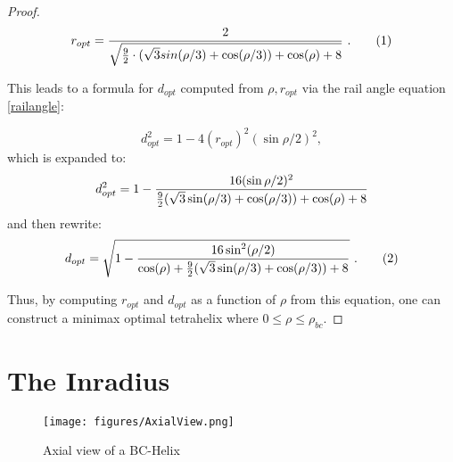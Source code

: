 \documentclass[10pt,final]{journals-1.0/asme2ej}
\newcommand\numberthis{\addtocounter{equation}{1}\tag{\theequation}}
\begin{document}
\begin{proof}
\begin{equation}
  r_{opt} = \frac{2}{\sqrt{\frac{9}{2} \cdot ( \sqrt{3} sin(\rho/3) + \cos(\rho/3)) + \cos(\rho)+ 8 }} \text{ .} \numberthis  \label{eqrhoopt}
\end{equation}


This leads to a formula for $ d_{opt} $ computed from $\rho, r_{opt}$ via the rail angle equation \cref{railangle}:

\begin{equation}
  d_{opt}^2 = 1 - 4 (r_{opt})^2 (\sin{ \rho / 2})^2,
\end{equation}
which is expanded to:
\begin{equation}
  d_{opt}^2 = 1 - \frac{16(\sin{ \rho / 2})^2}{\frac{9}{2} ( \sqrt{3} \sin(\rho/3) + \cos(\rho/3)) + \cos(\rho)+ 8 }    \\
\end{equation}
and then rewrite:
\begin{equation}
    d_{opt} = \sqrt{1 - \frac{16 \sin^2(\rho / 2) }{ \cos(\rho) + \frac{9}{2} ( \sqrt{3} \sin(\rho/3) + \cos(\rho/3)) + 8 }}  \text{ .}  \numberthis  \label{dopt}  \\      
\end{equation}



Thus, by computing $r_{opt}$  and $d_{opt}$ as a function of $\rho$ from this equation, one can
construct a minimax optimal tetrahelix where $0 \leq \rho \leq \rho_{bc}$.
\end{proof}

\section{The Inradius}

\begin{figure}
     \centering
     \texttt{[image: figures/AxialView.png]}
     \caption{Axial view of a BC-Helix}
  \label{axialview}     
\end{figure}
\end{document}
